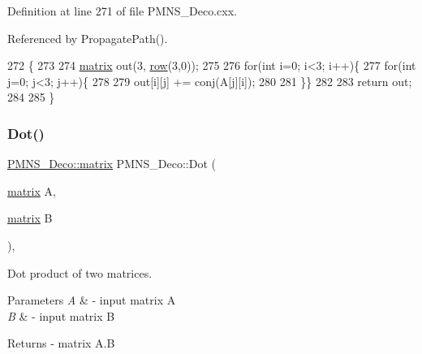 Definition at line 271 of file P\+M\+N\+S\+\_\+\+Deco.\+cxx.



Referenced by Propagate\+Path().


\begin{DoxyCode}
272 \{
273 
274   \hyperlink{classOscProb_1_1PMNS__Deco_a77b4e0c041b6268910a270be0f5387c9}{matrix} out(3, \hyperlink{classOscProb_1_1PMNS__Deco_a34634741bc68bc1c524cf47f44e7f5b6}{row}(3,0));
275   
276   \textcolor{keywordflow}{for}(\textcolor{keywordtype}{int} i=0; i<3; i++)\{
277   \textcolor{keywordflow}{for}(\textcolor{keywordtype}{int} j=0; j<3; j++)\{
278   
279     out[i][j] += conj(A[j][i]);
280 
281   \}\}
282   
283   \textcolor{keywordflow}{return} out;
284 
285 \}
\end{DoxyCode}
\mbox{\label{classOscProb_1_1PMNS__Deco_a8d6b547de294c0d52d4208bde44fe171}} 
\subsubsection{\texorpdfstring{Dot()}{Dot()}}
{\footnotesize\ttfamily \hyperlink{classOscProb_1_1PMNS__Deco_a77b4e0c041b6268910a270be0f5387c9}{P\+M\+N\+S\+\_\+\+Deco\+::matrix} P\+M\+N\+S\+\_\+\+Deco\+::\+Dot (\begin{DoxyParamCaption}\item[{\hyperlink{classOscProb_1_1PMNS__Deco_a77b4e0c041b6268910a270be0f5387c9}{matrix}}]{A,  }\item[{\hyperlink{classOscProb_1_1PMNS__Deco_a77b4e0c041b6268910a270be0f5387c9}{matrix}}]{B }\end{DoxyParamCaption})\hspace{0.3cm}{\ttfamily [protected]}, {\ttfamily [virtual]}}

Dot product of two matrices.


\begin{DoxyParams}{Parameters}
{\em A} & -\/ input matrix A \\
\hline
{\em B} & -\/ input matrix B\\
\hline
\end{DoxyParams}
\begin{DoxyReturn}{Returns}
-\/ matrix A.\+B 
\end{DoxyReturn}


